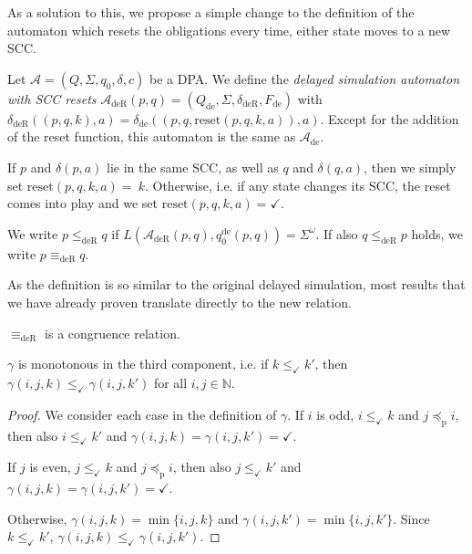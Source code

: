 As a solution to this, we propose a simple change to the definition of the automaton which resets the obligations every time, either state moves to a new SCC. 

\begin{defn}
	Let $\mathcal{A} = (Q, \Sigma, q_0, \delta, c)$ be a DPA. We define the \emph{delayed simulation automaton with SCC resets} $\mathcal{A}_\text{deR}(p, q) = (Q_\text{de}, \Sigma, \delta_\text{deR}, F_\text{de})$ with $\delta_\text{deR}((p, q, k), a) = \delta_\text{de}((p, q, \text{reset}(p, q, k, a)), a)$. Except for the addition of the reset function, this automaton is the same as $\mathcal{A}_\text{de}$.
	
	If $p$ and $\delta(p, a)$ lie in the same SCC, as well as $q$ and $\delta(q, a)$, then we simply set $\text{reset}(p, q, k, a) =~k$. Otherwise, i.e. if any state changes its SCC, the reset comes into play and we set $\text{reset}(p, q, k, a) = \checkmark$.
	
	We write $p \leq_\text{deR} q$ if $L(\mathcal{A}_\text{deR}(p, q), q_0^\text{de}(p, q)) = \Sigma^\omega$. If also $q \leq_\text{deR} p$ holds, we write $p \equiv_\text{deR} q$.
\end{defn}

As the definition is so similar to the original delayed simulation, most results that we have already proven translate directly to the new relation. 

\begin{theorem}
	$\equiv_\text{deR}$ is a congruence relation.
\end{theorem}

\begin{lem}
\label{lem:fritzwilke:gamma_mono}
	$\gamma$ is monotonous in the third component, i.e. if $k \leq_\checkmark k'$, then $\gamma(i, j, k) \leq_\checkmark \gamma(i, j, k')$ for all $i, j \in \mathbb{N}$.
\end{lem}

\begin{proof}
	We consider each case in the definition of $\gamma$. If $i$ is odd, $i \leq_\checkmark k$ and $j \preceq_\text{p} i$, then also $i \leq_\checkmark k'$ and $\gamma(i, j, k) = \gamma(i, j, k') = \checkmark$.
	
	If $j$ is even, $j \leq_\checkmark k$ and $j \preceq_\text{p} i$, then also $j \leq_\checkmark k'$ and $\gamma(i, j, k) = \gamma(i, j, k') = \checkmark$.
	
	Otherwise, $\gamma(i, j, k) = \min \{i, j, k\}$ and $\gamma(i, j, k') = \min \{i, j, k'\}$. Since $k \leq_\checkmark k'$, $\gamma(i, j, k) \leq_\checkmark \gamma(i, j, k')$.
\end{proof}


